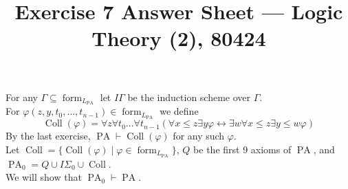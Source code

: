 
\title{Exercise 7 Answer Sheet --- Logic Theory (2), 80424}

\DeclareMathOperator{\PA}{PA}
\DeclareMathOperator{\Coll}{Coll}
\DeclareMathOperator{\Ind}{Ind}
\DeclareMathOperator{\Sat}{Sat}


\maketitle
\maketitleprint[yellow]

\question{}
For any $\Gamma \subseteq \operatorname{form}_{L_{\PA}}$ let $I \Gamma$ be the induction scheme over $\Gamma$. \\
For $\varphi(z, y, t_0, \ldots, t_{n - 1}) \in \operatorname{form}_{L_{\PA}}$ we define
\[
	\Coll(\varphi) = \forall z \forall t_0 \ldots \forall t_{n - 1} (\forall x \le z \exists y \varphi \leftrightarrow \exists w \forall x \le z \exists y \le w \varphi)
\]
By the last exercise, $\PA \vdash \Coll(\varphi)$ for any such $\varphi$. \\
Let $\Coll = \{ \Coll(\varphi) \mid \varphi \in \operatorname{form}_{L_{\PA}} \}$, $Q$ be the first 9 axioms of $\PA$, and $\PA_0 = Q \cup I \Sigma_0 \cup \Coll$. \\
We will show that $\PA_0 \vdash \PA$.
